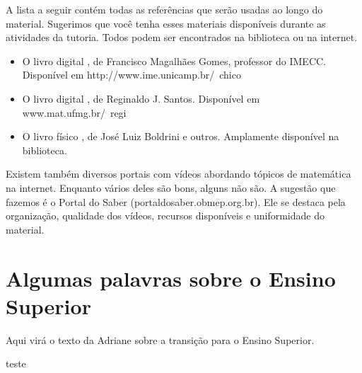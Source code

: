 \documentclass[10pt,openany]{book}
\begin{document}
A lista a seguir contém todas as referências que serão usadas ao longo do material. Sugerimos que você tenha esses materiais disponíveis durante as atividades da tutoria. Todos podem ser encontrados na biblioteca ou na internet.

\begin{itemize}
 \item O livro digital , de Francisco Magalhães Gomes, professor do IMECC. Disponível em http://www.ime.unicamp.br/~chico
 \item O livro digital , de Reginaldo J. Santos. Disponível em www.mat.ufmg.br/~regi
 \item O livro físico , de José Luiz Boldrini e outros. Amplamente disponível na biblioteca.
\end{itemize}

Existem também diversos portais com vídeos abordando tópicos de matemática na internet. Enquanto vários deles são bons, alguns não são. A sugestão que fazemos é o Portal do Saber (portaldosaber.obmep.org.br). Ele se destaca pela organização, qualidade dos vídeos, recursos disponíveis e uniformidade do material.

\section{Algumas palavras sobre o Ensino Superior}

Aqui virá o texto da Adriane sobre a transição para o Ensino Superior.

\newpage








 




teste
 
\end{document}
